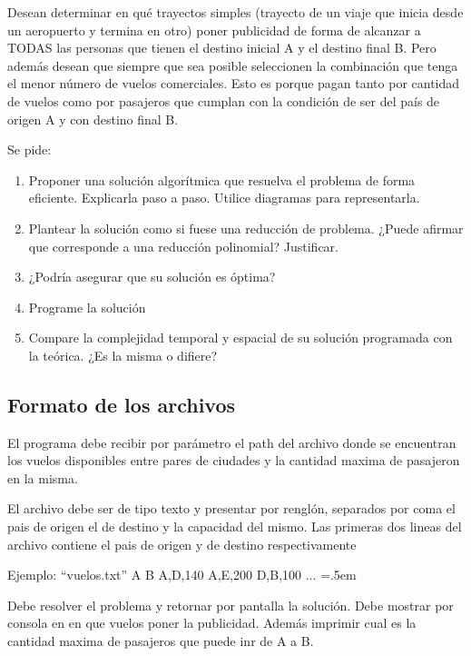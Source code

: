 \documentclass[titlepage,a4paper]{article}
\newenvironment{lcverbatim}
 {\SaveVerbatim{cverb}}
 {\endSaveVerbatim
  \flushleft\fboxrule=0pt\fboxsep=.5em
  \colorbox{cverbbg}{%
    \makebox[\dimexpr\linewidth-2\fboxsep][l]{\BUseVerbatim{cverb}}%
  }
  \endflushleft
}
\begin{document}
Desean determinar en qué trayectos simples (trayecto de un viaje que inicia desde un aeropuerto y termina en otro) poner publicidad de forma de alcanzar a TODAS las personas que tienen el destino inicial A y el destino final B. Pero además desean que siempre que sea posible seleccionen la combinación que tenga el menor número de vuelos comerciales. Esto es porque pagan tanto por cantidad de vuelos como por pasajeros que cumplan con la condición de ser del país de origen A y con destino final B.

\noindent Se pide:
\begin{enumerate}
    \item Proponer una solución algorítmica que resuelva el problema de forma eficiente. Explicarla paso a paso. Utilice diagramas para representarla.
    \item Plantear la solución como si fuese una reducción de problema. ¿Puede afirmar que corresponde a una reducción polinomial? Justificar.
    \item ¿Podría asegurar que su solución es óptima?
    \item Programe la solución
    \item Compare la complejidad temporal y espacial de su solución programada con la teórica. ¿Es la misma o difiere?
\end{enumerate}

\subsection{Formato de los archivos}\label{enuncFormatoArchivos}
El programa debe recibir por parámetro el path del archivo donde se encuentran los vuelos disponibles entre pares de ciudades y la cantidad maxima de pasajeron en la misma.

El archivo debe ser de tipo texto y presentar por renglón, separados por coma el pais de origen el de destino y la capacidad del mismo. Las primeras dos lineas del archivo contiene el pais de origen y de destino respectivamente

Ejemplo: “vuelos.txt”
\begin{lcverbatim}
    A
    B
    A,D,140
    A,E,200
    D,B,100
    ...
\end{lcverbatim}

Debe resolver el problema y retornar por pantalla la solución. Debe mostrar por consola en en que vuelos poner la publicidad. Además imprimir cual es la cantidad maxima de pasajeros que puede inr de A a B.
\end{document}
